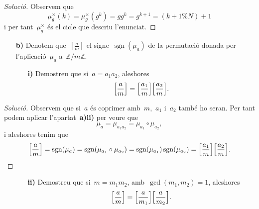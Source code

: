 \documentclass[a4paper]{article}
\newcommand{\ZZ}{\mathbb{Z}}
\DeclareMathOperator{\sgn}{sgn}
\newenvironment{solution}{
    \renewcommand\qedsymbol{\ensuremath{\lozenge}}
    \begin{proof}[Solució]
        }{
    \end{proof}
}
\begin{document}
\begin{solution}
    Observem que
    \[
        \mu_{g}^{\times}(k)
        = \mu_{g}^{\times}(g^{k})
        = gg^{k}
        = g^{k+1}
        = (k+1\%N)+1
    \]
    i per tant~\(\mu_{g}^{\times}\) és el cicle que descriu l'enunciat.
\end{solution}

\begin{enumerate}
    \item[\textbf{b)}] Denotem que~\([\frac{a}{m}]\) el signe~\(\sgn(\mu_{a})\)
        de la permutació donada per l'aplicació~\(\mu_{a}\) a~\(\ZZ/m\ZZ\).
        \begin{enumerate}
            \item[\textbf{i)}] Demostreu que si~\(a=a_{1}a_{2}\), aleshores
                \[
                    \Bigl[\frac{a}{m}\Bigr]
                    =
                    \Bigl[\frac{a_{1}}{m}\Bigr]
                    \Bigl[\frac{a_{2}}{m}\Bigr].
                \]
        \end{enumerate}
\end{enumerate}

\begin{solution}
    Observem que si~\(a\) és coprimer amb~\(m\),~\(a_{1}\) i~\(a_{2}\) també ho
    seran. Per tant podem aplicar l'apartat~\textbf{a)ii)} per veure que
    \[
        \mu_{a} = \mu_{a_{1}a_{2}} = \mu_{a_{1}}\circ\mu_{a_{2}},
    \]
    i aleshores tenim que
    \[
        \Bigl[\frac{a}{m}\Bigr]
        = \sgn(\mu_{a})
        = \sgn(\mu_{a_{1}}\circ\mu_{a_{2}})
        = \sgn(\mu_{a_{1}})\sgn(\mu_{a_{2}})
        = \Bigl[\frac{a_{1}}{m}\Bigr]\Bigl[\frac{a_{2}}{m}\Bigr].
        \qedhere
    \]
\end{solution}

\begin{enumerate}
    \item[]\begin{enumerate}
        \item[\textbf{ii)}] Demostreu que si~\(m=m_{1}m_{2}\),
            amb~\(\gcd(m_{1},m_{2})=1\), aleshores
            \[
                \Bigl[\frac{a}{m}\Bigr]
                =
                \Bigl[\frac{a}{m_{1}}\Bigr]
                \Bigl[\frac{a}{m_{2}}\Bigr].
            \]
    \end{enumerate}
\end{enumerate}
\end{document}
